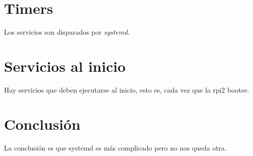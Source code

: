 \documentclass[10pt,a4paper]{article}
\begin{document}
\section{Timers}

Los servicios son disparados por \emph{systemd}.

\section{Servicios al inicio}

Hay servicios que deben ejecutarse al inicio, esto es, cada vez que la rpi2 bootee.

\section{Conclusi\'on}

La conclusi\'on es que systemd es m\'as complicado pero no nos queda otra.
\end{document}
